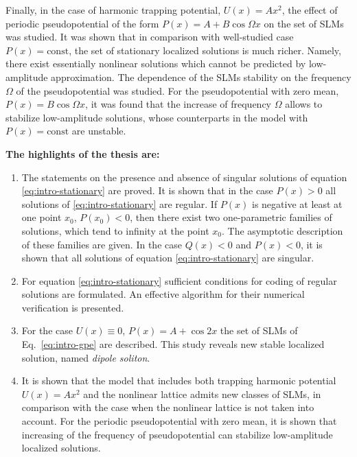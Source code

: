 Finally, in the case of harmonic trapping potential, $U(x) = A x^2$, the effect of periodic pseudopotential of the form $P(x) = A + B \cos \Omega x$ on the set of SLMs was studied.
It was shown that in comparison with well-studied case $P(x) = \mathrm{const}$, the set of stationary localized solutions is much richer.
Namely, there exist essentially nonlinear solutions which cannot be predicted by low-amplitude approximation.
The dependence of the SLMs stability on the frequency $\Omega$ of the pseudopotential was studied.
For the pseudopotential with zero mean, $P(x) = B \cos \Omega x$, it was found that the increase of frequency $\Omega$ allows to stabilize low-amplitude solutions, whose counterparts in the model with $P(x) = \mathrm{const}$ are unstable.

\textbf{The highlights of the thesis are:}
\begin{enumerate}
	\item The statements on the presence and absence of singular solutions of equation \eqref{eq:intro-stationary} are proved.
		It is shown that in the case $P(x) > 0$ all solutions of \eqref{eq:intro-stationary} are regular.
		If $P(x)$ is negative at least at one point $x_0$, $P(x_0) < 0$, then there exist two one-parametric families of solutions, which tend to infinity at the point $x_0$.
		The asymptotic description of these families are given.
		In the case $Q(x) < 0$ and $P(x) < 0$, it is shown that all solutions of equation \eqref{eq:intro-stationary} are singular.
	\item For equation \eqref{eq:intro-stationary} sufficient conditions for coding of regular solutions are formulated.
		An effective algorithm for their numerical verification is presented.
	\item For the case $U(x) \equiv 0$, $P(x) = A + \cos 2x$ the set of SLMs of Eq.~\eqref{eq:intro-gpe} are described.
		This study reveals new stable localized solution, named {\it dipole soliton}.
	\item It is shown that the model that includes both trapping harmonic potential $U(x) = A x^2$ and the nonlinear lattice admits new classes of SLMs, in comparison with the case when the nonlinear lattice is not taken into account.
		For the periodic pseudopotential with zero mean, it is shown that increasing of the frequency of pseudopotential can stabilize low-amplitude localized solutions.
\end{enumerate}

